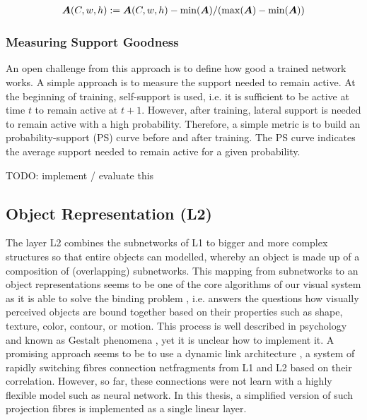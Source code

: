\begin{align}\eqlbl{norm_lat3}
	\boldsymbol{A}(C,w,h) :=  \boldsymbol{A}(C,w,h)  - \min(\boldsymbol{A}) / (\max(\boldsymbol{A}) - \min(\boldsymbol{A}))
\end{align}





\subsubsection{Measuring Support Goodness}
An open challenge from this approach is to define how good a trained network works.
A simple approach is to measure the support needed to remain active.
At the beginning of training, self-support is used, i.e. it is sufficient to be active at time $t$ to remain active at $t+1$.
However, after training, lateral support is needed to remain active with a high probability.
Therefore, a simple metric is to build an probability-support (PS) curve before and after training.
The PS curve indicates the average support needed to remain active for a given probability.

TODO: implement / evaluate this


\subsection{Object Representation (L2)}
The layer L2 combines the subnetworks of L1 to bigger and more complex structures so that entire objects can modelled, whereby an object is made up of a composition of (overlapping) subnetworks.
This mapping from subnetworks to an object representations seems to be one of the core algorithms of our visual system as it is able to solve the binding problem , i.e. answers the questions how visually perceived objects are bound together based on their properties such as shape, texture, color, contour, or motion. This process is well described in psychology and known as Gestalt phenomena , yet it is unclear how to implement it.
A promising approach seems to be to use a dynamic link architecture , 
a system of rapidly switching fibres connection netfragments from L1 and L2 based on their correlation.
However, so far, these connections were not learn with a highly flexible model such as neural network.
In this thesis, a simplified version of such projection fibres is implemented as a single linear layer.

